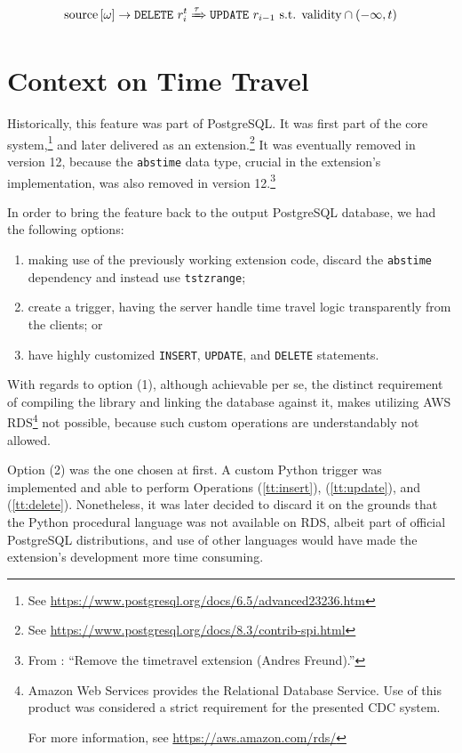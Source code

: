 \begin{equation}\label{tt:delete}
	\text{source}\left[{\omega}\right] \rightarrow \text{\texttt{DELETE} } r_i^t \xRightarrow{\tau}
	\text{\texttt{UPDATE} } r_{i-1} \text{ s.t. } \text{validity} \cap (-\infty, t)
\end{equation}


\section{Context on Time Travel}

Historically, this feature was part of PostgreSQL.
It was first part of the core system,\footnote{%
	See \url{https://www.postgresql.org/docs/6.5/advanced23236.htm}\lastvisited
} and later delivered as an extension.\footnote{%
	See \url{https://www.postgresql.org/docs/8.3/contrib-spi.html}\lastvisited
}
It was eventually removed in version 12, because the \texttt{abstime} data type, crucial in the extension's implementation, was also removed in version 12.\footnote{%
	From \cite{pg-release-notes}: ``Remove the timetravel extension (Andres Freund).''
}

In order to bring the feature back to the output PostgreSQL database, we had the following options:
\begin{enumerate}
	\item making use of the previously working extension code, discard the \texttt{abstime} dependency and instead use \texttt{tstzrange};
	\item create a trigger, having the server handle time travel logic transparently from the clients; or
	\item have highly customized \texttt{INSERT}, \texttt{UPDATE}, and \texttt{DELETE} statements.
\end{enumerate}

With regards to option (1), although achievable per se, the distinct requirement of compiling the library and linking the database against it, makes utilizing AWS RDS\footnote{%
	Amazon Web Services provides the Relational Database Service.
	Use of this product was considered a strict requirement for the presented CDC system.
	
	For more information, see \url{https://aws.amazon.com/rds/}\lastvisited
} not possible, because such custom operations are understandably not allowed.

Option (2) was the one chosen at first.
A custom Python trigger was implemented and able to perform Operations (\ref{tt:insert}), (\ref{tt:update}), and (\ref{tt:delete}).
Nonetheless, it was later decided to discard it on the grounds that the Python procedural language was not available on RDS, albeit part of official PostgreSQL distributions, and use of other languages would have made the extension's development more time consuming.

